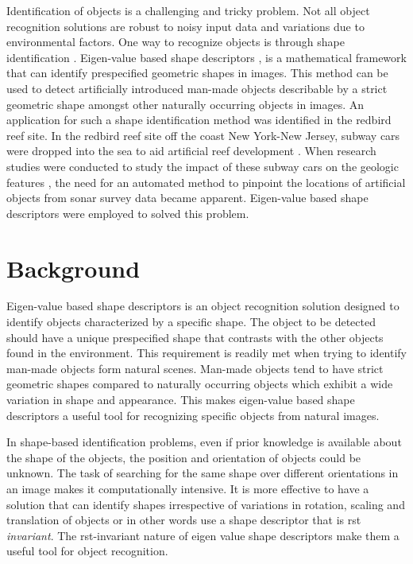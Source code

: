 \documentclass {udthesis}
\begin{document}
Identification of objects is a challenging and tricky problem. Not all object recognition solutions are robust to noisy input data and variations due to environmental factors. One way to recognize objects is through shape identification \cite{shape_survey}. Eigen-value based shape descriptors \cite{khabou,zuliani}, is a mathematical framework that can identify prespecified geometric shapes in images. This method can be used to detect artificially introduced man-made objects describable by a strict geometric shape amongst other naturally occurring objects in images. An application for such a shape identification method was identified in the redbird reef site. In the redbird reef site off the coast New York-New Jersey, subway cars were dropped into the sea to aid artificial reef development \cite{redbird1, redbird2}. When research studies were conducted to study the impact of these subway cars on the geologic features \cite{redbird_nicole, redbird_art}, the need for an automated method to pinpoint the locations of artificial objects 
from sonar survey data became apparent. Eigen-value based shape descriptors were employed to solved this problem.


\section{Background}

Eigen-value based shape descriptors is an object recognition solution designed to identify objects characterized by a specific shape. The object to be detected should have a unique prespecified shape that contrasts with the other objects found in the environment. This requirement is readily met when trying to identify man-made objects form natural scenes. Man-made objects tend to have strict geometric shapes compared to naturally occurring objects which exhibit a wide variation in shape and appearance. This makes eigen-value based shape descriptors a useful tool for recognizing specific objects from natural images.

In shape-based identification problems, even if prior knowledge is available about the shape of the objects, the position and orientation of objects could be unknown. The task of searching for the same shape over different orientations in an image makes it computationally intensive. It is more effective to have a solution that can identify shapes irrespective of variations in rotation, scaling and translation of objects or in other words use a shape descriptor that is \gls{rst} \textit{invariant}. The \gls{rst}-invariant nature of eigen value shape descriptors make them a useful tool for object recognition. 
\end{document}

